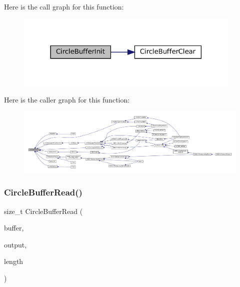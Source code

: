 Here is the call graph for this function\+:
\nopagebreak
\begin{figure}[H]
\begin{center}
\leavevmode
\includegraphics[width=306pt]{circle-buffer_8c_afaa8d0d895fcf4ce976a956ef6cc97bb_cgraph}
\end{center}
\end{figure}
Here is the caller graph for this function\+:
\nopagebreak
\begin{figure}[H]
\begin{center}
\leavevmode
\includegraphics[width=350pt]{circle-buffer_8c_afaa8d0d895fcf4ce976a956ef6cc97bb_icgraph}
\end{center}
\end{figure}
\mbox{\label{circle-buffer_8c_a1707584743172130e8ad7069926d985d}} 
\subsubsection{\texorpdfstring{Circle\+Buffer\+Read()}{CircleBufferRead()}}
{\footnotesize\ttfamily size\+\_\+t Circle\+Buffer\+Read (\begin{DoxyParamCaption}\item[{struct Circle\+Buffer $\ast$}]{buffer,  }\item[{void $\ast$}]{output,  }\item[{size\+\_\+t}]{length }\end{DoxyParamCaption})}

